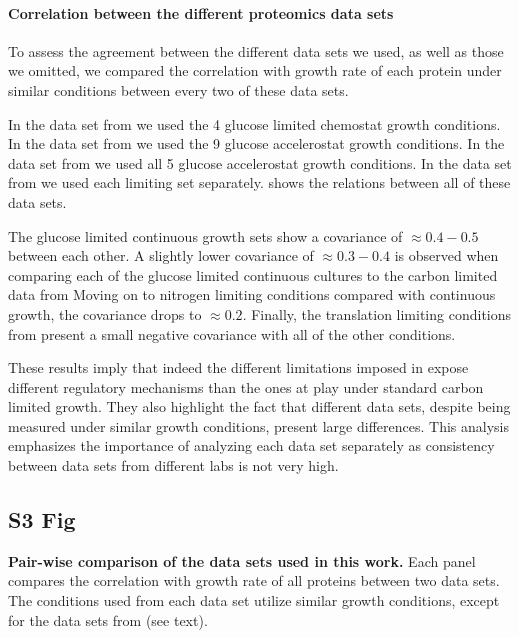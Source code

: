 \documentclass[10pt,letterpaper]{article}
\begin{document}
\paragraph{Correlation between the different proteomics data sets}
To assess the agreement between the different data sets we used, as well as those we omitted, we compared the correlation with growth rate of each protein under similar conditions between every two of these data sets.

In the data set from \cite{Schmidt2015} we used the 4 glucose limited chemostat growth conditions.
In the data set from \cite{Peebo_2015} we used the 9 glucose accelerostat growth conditions.
In the data set from \cite{Valgepea2013} we used all 5 glucose accelerostat growth conditions.
In the data set from \cite{Hui_2015} we used each limiting set separately.
 shows the relations between all of these data sets.

The glucose limited continuous growth sets show a covariance of $\approx 0.4-0.5$ between each other.
A slightly lower covariance of $\approx 0.3-0.4$ is observed when comparing each of the glucose limited continuous cultures to the carbon limited data from \cite{Hui_2015}
Moving on to nitrogen limiting conditions compared with continuous growth, the covariance drops to $\approx 0.2$.
Finally, the translation limiting conditions from \cite{Hui_2015} present a small negative covariance with all of the other conditions.

These results imply that indeed the different limitations imposed in \cite{Hui_2015} expose different regulatory mechanisms than the ones at play under standard carbon limited growth.
They also highlight the fact that different data sets, despite being measured under similar growth conditions, present large differences.
This analysis emphasizes the importance of analyzing each data set separately as consistency between data sets from different labs is not very high.

\subsection*{S3 Fig}
\label{fig:chemcorrcomp}
    {\bf Pair-wise comparison of the data sets used in this work.}
Each panel compares the correlation with growth rate of all proteins between two data sets.
The conditions used from each data set utilize similar growth conditions, except for the data sets from \cite{Hui_2015} (see text).
\end{document}
